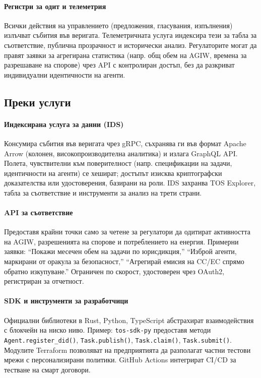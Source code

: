 \documentclass[11pt]{article}
\begin{document}
\paragraph{Регистри за одит и телеметрия} Всички действия на управлението (предложения, гласувания, изпълнения) излъчват събития във веригата. Телеметричната услуга индексира тези за табла за съответствие, публична прозрачност и исторически анализ. Регулаторите могат да правят заявки за агрегирана статистика (напр. общ обем на AGIW, времена за разрешаване на спорове) чрез API с контролиран достъп, без да разкриват индивидуални идентичности на агенти.

\subsection{Преки услуги}
\paragraph{Индексирана услуга за данни (IDS)} Консумира събития във веригата чрез gRPC, съхранява ги във формат Apache Arrow (колонен, високопроизводителна аналитика) и излага GraphQL API. Полета, чувствителни към поверителност (напр. спецификации на задачи, идентичности на агенти) се хешират; достъпът изисква криптографски доказателства или удостоверения, базирани на роли. IDS захранва TOS Explorer, табла за съответствие и инструменти за анализ на трети страни.

\paragraph{API за съответствие} Предоставя крайни точки само за четене за регулатори да одитират активността на AGIW, разрешенията на спорове и потреблението на енергия. Примерни заявки: ``Покажи месечен обем на задачи по юрисдикция,'' ``Изброй агенти, маркирани от оракула за безопасност,'' ``Агрегирай емисия на CC/EC спрямо обратно изкупуване.'' Ограничен по скорост, удостоверен чрез OAuth2, регистриран за отчетност.

\paragraph{SDK и инструменти за разработчици} Официални библиотеки в Rust, Python, TypeScript абстрахират взаимодействия с блокчейн на ниско ниво. Пример: \texttt{tos-sdk-py} предоставя методи \texttt{Agent.register\_did()}, \texttt{Task.publish()}, \texttt{Task.claim()}, \texttt{Task.submit()}. Модулите Terraform позволяват на предприятията да разполагат частни тестови мрежи с персонализирани политики. GitHub Actions интегрират CI/CD за тестване на смарт договори.
\end{document}
